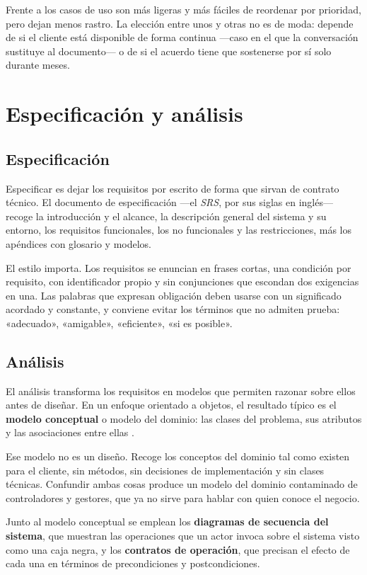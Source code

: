 Frente a los casos de uso son más ligeras y más fáciles de reordenar por
prioridad, pero dejan menos rastro. La elección entre unos y otras no es de moda:
depende de si el cliente está disponible de forma continua —caso en el que la
conversación sustituye al documento— o de si el acuerdo tiene que sostenerse por
sí solo durante meses.

\section{Especificación y análisis}

\subsection*{Especificación}

Especificar es dejar los requisitos por escrito de forma que sirvan de contrato
técnico. El documento de especificación —el \emph{SRS}, por sus siglas en
inglés— recoge la introducción y el alcance, la descripción general del sistema y
su entorno, los requisitos funcionales, los no funcionales y las restricciones,
más los apéndices con glosario y modelos.

El estilo importa. Los requisitos se enuncian en frases cortas, una condición por
requisito, con identificador propio y sin conjunciones que escondan dos
exigencias en una. Las palabras que expresan obligación deben usarse con un
significado acordado y constante, y conviene evitar los términos que no admiten
prueba: «adecuado», «amigable», «eficiente», «si es posible».

\subsection*{Análisis}

El análisis transforma los requisitos en modelos que permiten razonar sobre ellos
antes de diseñar. En un enfoque orientado a objetos, el resultado típico es el
\textbf{modelo conceptual} o modelo del dominio: las clases del problema, sus
atributos y las asociaciones entre ellas \cite{larman2006}.

Ese modelo no es un diseño. Recoge los conceptos del dominio tal como existen para
el cliente, sin métodos, sin decisiones de implementación y sin clases técnicas.
Confundir ambas cosas produce un modelo del dominio contaminado de controladores y
gestores, que ya no sirve para hablar con quien conoce el negocio.

Junto al modelo conceptual se emplean los \textbf{diagramas de secuencia del
sistema}, que muestran las operaciones que un actor invoca sobre el sistema visto
como una caja negra, y los \textbf{contratos de operación}, que precisan el efecto
de cada una en términos de precondiciones y postcondiciones.

